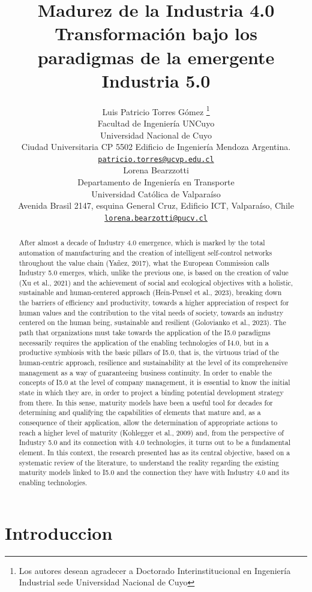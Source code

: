 \documentclass{article}
\title{Madurez de la Industria 4.0 Transformación bajo los paradigmas de
la emergente Industria 5.0}
\author{
    Luis Patricio Torres Gómez
    \thanks{Los autores desean agradecer a Doctorado Interinstitucional
en Ingeniería Industrial sede Universidad Nacional de Cuyo}
   \\
    Facultad de Ingeniería UNCuyo \\
    Universidad Nacional de Cuyo \\
  Ciudad Universitaria CP 5502 Edificio de Ingeniería Mendoza
Argentina. \\
  \texttt{\href{mailto:patricio.torres@ucvp.edu.cl}{\nolinkurl{patricio.torres@ucvp.edu.cl}}} \\
   \And
    Lorena Bearzzotti
   \\
    Departamento de Ingeniería en Transporte \\
    Universidad Católica de Valparaíso \\
  Avenida Brasil 2147, esquina General Cruz, Edificio ICT, Valparaíso,
Chile \\
  \texttt{\href{mailto:lorena.bearzotti@pucv.cl}{\nolinkurl{lorena.bearzotti@pucv.cl}}} \\
  }
\begin{document}
\maketitle


\begin{abstract}
After almost a decade of Industry 4.0 emergence, which is marked by the
total automation of manufacturing and the creation of intelligent
self-control networks throughout the value chain (Yañez, 2017), what the
European Commission calls Industry 5.0 emerges, which, unlike the
previous one, is based on the creation of value (Xu et al., 2021) and
the achievement of social and ecological objectives with a holistic,
sustainable and human-centered approach (Hein-Pensel et al., 2023),
breaking down the barriers of efficiency and productivity, towards a
higher appreciation of respect for human values and the contribution to
the vital needs of society, towards an industry centered on the human
being, sustainable and resilient (Golovianko et al., 2023). The path
that organizations must take towards the application of the I5.0
paradigms necessarily requires the application of the enabling
technologies of I4.0, but in a productive symbiosis with the basic
pillars of I5.0, that is, the virtuous triad of the human-centric
approach, resilience and sustainability at the level of its
comprehensive management as a way of guaranteeing business continuity.
In order to enable the concepts of I5.0 at the level of company
management, it is essential to know the initial state in which they are,
in order to project a binding potential development strategy from there.
In this sense, maturity models have been a useful tool for decades for
determining and qualifying the capabilities of elements that mature and,
as a consequence of their application, allow the determination of
appropriate actions to reach a higher level of maturity (Kohlegger et
al., 2009) and, from the perspective of Industry 5.0 and its connection
with 4.0 technologies, it turns out to be a fundamental element. In this
context, the research presented has as its central objective, based on a
systematic review of the literature, to understand the reality regarding
the existing maturity models linked to I5.0 and the connection they have
with Industry 4.0 and its enabling technologies.
\end{abstract}


\section{Introduccion}\label{introduccion}
\end{document}
